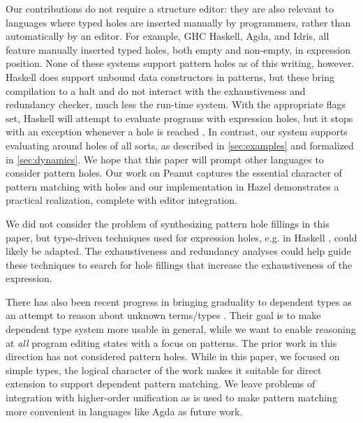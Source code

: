 Our contributions do not require a structure editor: they are also relevant to languages where typed holes are inserted 
manually by programmers, rather than automatically by an editor. 
For example, GHC Haskell, Agda, and Idris, all feature manually inserted typed holes, both empty and non-empty, in expression position.
%
None of these systems support pattern holes as of this writing, however. Haskell does support unbound data constructors in patterns, but these bring compilation to a halt and do not interact with the exhaustiveness and redundancy checker, much less the run-time system. With the appropriate flags set, Haskell will attempt to evaluate programs with expression holes, but it stops with an exception whenever a hole is reached \cite{DBLP:conf/icfp/VytiniotisJM12}. In contrast, our system supports evaluating around holes of all sorts, as described in \autoref{sec:examples} and formalized in \autoref{sec:dynamics}. We hope that this paper will prompt other languages to 
consider pattern holes. Our work on Peanut captures the essential character of pattern matching with holes and our implementation in Hazel 
demonstrates a practical realization, complete with editor integration.

We did not consider the problem of synthesizing pattern hole fillings in this paper, but type-driven techniques used for expression holes, e.g. in Haskell \cite{DBLP:conf/haskell/Gissurarson18}, could likely be adapted. The exhaustiveness and redundancy analyses could help guide these techniques to search for hole fillings that increase the exhaustiveness of the  expression.

There has also been recent progress in bringing graduality to dependent types as an attempt to reason about unknown terms/types
\cite{DBLP:journals/pacmpl/EremondiTG19,DBLP:journals/pacmpl/EremondiGT22,DBLP:journals/toplas/Lennon-Bertrand22,DBLP:journals/pacmpl/MaillardLTT22}. 
Their goal is to make dependent type system more usable in general, while we want to enable reasoning at \textit{all} program editing states with a focus on patterns. The prior work  in this direction has not considered pattern holes. While in this paper, we focused on simple types, the logical character of the work makes it suitable for direct extension to support dependent pattern matching. We leave problems of integration with higher-order unification as is used to make pattern matching more convenient in languages like Agda as future work.

